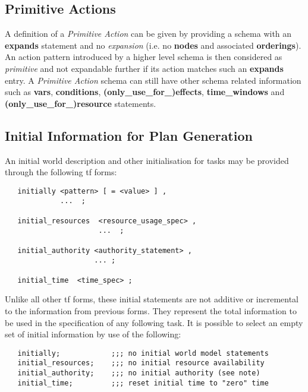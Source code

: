 \subsection{Primitive Actions}

A definition of a {\em Primitive Action} can be given by providing a
schema with an {\bf expands} statement and no {\em expansion} (i.e.  no
{\bf nodes} and associated {\bf orderings}).  An action pattern
introduced by a higher level schema is then considered as {\em
primitive} and not expandable further if its action 
matches such an {\bf expands} entry.  A {\em Primitive Action } schema
can still have other schema related information such as {\bf vars}, {\bf
conditions}, {\bf (only\_use\_for\_)effects}, {\bf time\_windows} and
{\bf (only\_use\_for\_)resource} statements. 

\subsection{Initial Information for Plan Generation}

An initial world description and other initialisation for tasks may be
provided through the following {\sc tf} forms:

\begin{verbatim}
   initially <pattern> [ = <value> ] ,
             ...  ;

   initial_resources  <resource_usage_spec> ,
                      ...  ;

   initial_authority <authority_statement> ,
                     ... ;

   initial_time  <time_spec> ;
\end{verbatim}

Unlike all other {\sc tf} forms, these initial statements are not additive or
incremental to the information from previous forms.  They represent the total
information to be used in the specification of any following task.  It is
possible to select an empty set of initial information by use of the
following:

\begin{verbatim}
   initially;            ;;; no initial world model statements
   initial_resources;    ;;; no initial resource availability
   initial_authority;    ;;; no initial authority (see note)
   initial_time;         ;;; reset initial time to "zero" time
\end{verbatim}

